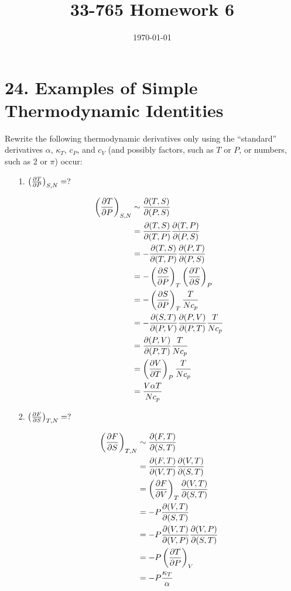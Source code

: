 \documentclass[a4paper,twoside]{article}
\title{33-765 Homework 6}
\date{\today}
\begin{document}
\maketitle

\section*{24. Examples of Simple Thermodynamic Identities}
Rewrite the following thermodynamic derivatives only using the ``standard'' derivatives $ \alpha $, $ \kappa_T $, $ c_P $, and $ c_V $ (and possibly factors, such as $ T $ or $ P $, or numbers, such as $ 2 $ or $ \pi $) occur:
\begin{itemize}
    \item[1.] $ \left( \pdv{T}{P} \right)_{S,N} = ? $
        \begin{problem}
            \begin{align}
                \left( \pdv{T}{P} \right)_{S,N} &\sim \pdv{(T,S)}{(P,S)} \\
                &= \pdv{(T,S)}{(T,P)} \pdv{(T,P)}{(P,S)} \\
                &= -\pdv{(T,S)}{(T,P)} \pdv{(P,T)}{(P,S)} \\
                &= - \left( \pdv{S}{P} \right)_{T} \left( \pdv{T}{S} \right)_{P} \\
                &= - \left( \pdv{S}{P} \right)_{T} \frac{T}{N c_p} \\
                &= - \pdv{(S,T)}{(P,V)} \pdv{(P,V)}{(P,T)} \frac{T}{N c_p} \\
                &= \pdv{(P,V)}{(P,T)} \frac{T}{N c_p} \\
                &= \left( \pdv{V}{T} \right)_{P} \frac{T}{N c_p} \\
                &= \frac{V \alpha T}{N c_p}
            \end{align}
        \end{problem}
    \item[2.] $ \left( \pdv{F}{S} \right)_{T,N} = ? $
        \begin{problem}
            \begin{align}
                \left( \pdv{F}{S} \right)_{T,N} &\sim \pdv{(F,T)}{(S,T)} \\
                &= \pdv{(F,T)}{(V,T)} \pdv{(V,T)}{(S,T)} \\
                &= \left( \pdv{F}{V} \right)_{T} \pdv{(V,T)}{(S,T)} \\
                &= - P \pdv{(V,T)}{(S,T)} \\
                &= - P \pdv{(V,T)}{(V,P)} \pdv{(V,P)}{(S,T)} \\
                &= - P \left( \pdv{T}{P} \right)_{V} \\
                &= - P \frac{\kappa_T}{\alpha} 
            \end{align}
        \end{problem}
\end{itemize}
\end{document}
